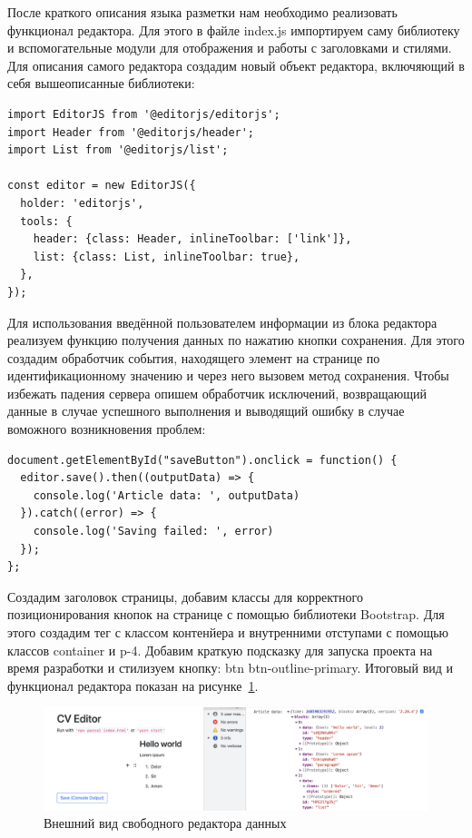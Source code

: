 \documentclass[master, och, diploma]{SCWorks}
\begin{document}
После краткого описания языка разметки нам необходимо реализовать функционал редактора. Для этого в файле index.js импортируем саму библиотеку и вспомогательные модули для отображения и работы с заголовками и стилями. Для описания самого редактора создадим новый объект редактора, включяющий в себя вышеописанные библиотеки:
\begin{verbatim}
import EditorJS from '@editorjs/editorjs'; 
import Header from '@editorjs/header'; 
import List from '@editorjs/list'; 

const editor = new EditorJS({ 
  holder: 'editorjs', 
  tools: { 
    header: {class: Header, inlineToolbar: ['link']}, 
    list: {class: List, inlineToolbar: true},
  }, 
});
\end{verbatim}


Для использования введённой пользователем информации из блока редактора реализуем функцию получения данных по нажатию кнопки сохранения. Для этого создадим обработчик события, находящего элемент на странице по идентификационному значению и через него вызовем метод сохранения. Чтобы избежать падения сервера опишем обработчик исключений, возвращающий данные в случае успешного выполнения и выводящий ошибку в случае воможного возникновения проблем:
\begin{verbatim}
document.getElementById("saveButton").onclick = function() {
  editor.save().then((outputData) => {
    console.log('Article data: ', outputData)
  }).catch((error) => {
    console.log('Saving failed: ', error)
  });
};   
\end{verbatim}

Создадим заголовок страницы, добавим классы для корректного позиционирования кнопок на странице с помощью библиотеки Bootstrap. Для этого создадим тег с классом контенйера и внутренними отступами с помощью классов container и p-4. Добавим краткую подсказку для запуска проекта на время разработки и стилизуем кнопку: btn btn-outline-primary. Итоговый вид и функционал редактора показан на рисунке~\ref{fig:22}.
\begin{figure}[!ht]
    \centering
    \includegraphics[width=12cm]{images/image22.png}
    \caption{\label{fig:22}%
        Внешний вид свободного редактора данных}
\end{figure}
\end{document}
